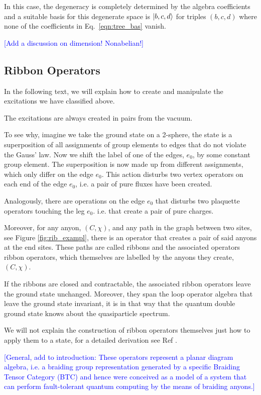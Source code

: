 \documentclass[two column]{article}
\newcommand{\jovan}[1]{\textcolor{blue}{[#1]}}
\begin{document}
In this case, the degeneracy is completely determined by the algebra coefficients and a suitable basis for this degenerate space is $\ket{b,c,d}$ for triples $(b,c,d)$ where none of the coefficients in Eq.~\eqref{eqn:tree_bas} vanish.


\jovan{Add a discussion on dimension! Nonabelian!}

\subsection{Ribbon Operators}

In the following text, we will explain how to create and manipulate the excitations we have classified above.

The excitations are always created in pairs from the vacuum. 

To see why, imagine we take the ground state on a 2-sphere, the state is a superposition of all assignments of group elements to edges that do not violate the Gauss' law. Now we shift the label of one of the edges, $e_0$, by some constant group element. The superposition is now made up from different assignments, which only differ on the edge $e_0$. This action disturbs two vertex operators on each end of the edge $e_0$, i.e. a pair of pure fluxes have been created.

Analogously, there are operations on the edge $e_0$ that disturbs two plaquette operators touching the leg $e_0$. i.e. that create a pair of pure charges.

Moreover, for any anyon, $(C, \chi)$, and any path in the graph between two sites, see Figure \ref{fig:rib_exampl}, there is an operator that creates a pair of said anyons at the end sites. These paths are called ribbons and the associated operators ribbon operators, which themselves are labelled by the anyons they create, $(C, \chi)$.

If the ribbons are closed and contractable, the associated ribbon operators leave the ground state unchanged. Moreover, they span the loop operator algebra that leave the ground state invariant, it is in that way that the quantum double ground state knows about the quasiparticle spectrum.

We will not explain the construction of ribbon operators themselves just how to apply them to a state, for a detailed derivation see Ref \cite{Kitaev_2003,cui2018topological}. 

\jovan{General, add to introduction: These operators represent a planar diagram algebra, i.e. a braiding group representation generated by a specific Braiding Tensor Category (BTC) and hence were conceived as a model of a system that can perform fault-tolerant quantum computing by the means of braiding anyons.} 
\end{document}
